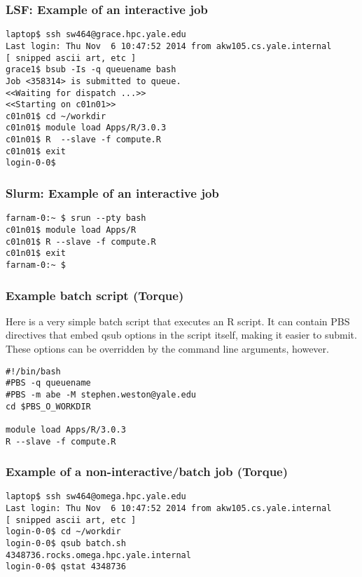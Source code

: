 \documentclass[10pt]{beamer}
\begin{document}
\begin{frame}[fragile]
\frametitle{LSF: Example of an interactive job}
\begin{verbatim}
laptop$ ssh sw464@grace.hpc.yale.edu
Last login: Thu Nov  6 10:47:52 2014 from akw105.cs.yale.internal
[ snipped ascii art, etc ]
grace1$ bsub -Is -q queuename bash
Job <358314> is submitted to queue.
<<Waiting for dispatch ...>>
<<Starting on c01n01>>
c01n01$ cd ~/workdir
c01n01$ module load Apps/R/3.0.3
c01n01$ R  --slave -f compute.R
c01n01$ exit 
login-0-0$ 
\end{verbatim}
\end{frame}

\begin{frame}[fragile]
\frametitle{Slurm: Example of an interactive job}
\begin{verbatim}
farnam-0:~ $ srun --pty bash
c01n01$ module load Apps/R
c01n01$ R --slave -f compute.R
c01n01$ exit
farnam-0:~ $
\end{verbatim}
\end{frame}

\begin{frame}[fragile]
\frametitle{Example batch script (Torque)}
Here is a very simple batch script that executes an R script.
It can contain PBS directives that embed qsub options
in the script itself, making it easier to submit.  These options
can be overridden by the command line arguments, however.

\begin{block}{}
\begin{verbatim}
#!/bin/bash
#PBS -q queuename
#PBS -m abe -M stephen.weston@yale.edu
cd $PBS_O_WORKDIR

module load Apps/R/3.0.3
R --slave -f compute.R
\end{verbatim}
\end{block}
\end{frame}

\begin{frame}[fragile]
\frametitle{Example of a non-interactive/batch job (Torque)}
\begin{verbatim}
laptop$ ssh sw464@omega.hpc.yale.edu
Last login: Thu Nov  6 10:47:52 2014 from akw105.cs.yale.internal
[ snipped ascii art, etc ]
login-0-0$ cd ~/workdir
login-0-0$ qsub batch.sh
4348736.rocks.omega.hpc.yale.internal
login-0-0$ qstat 4348736
\end{verbatim}
\end{frame}
\end{document}

